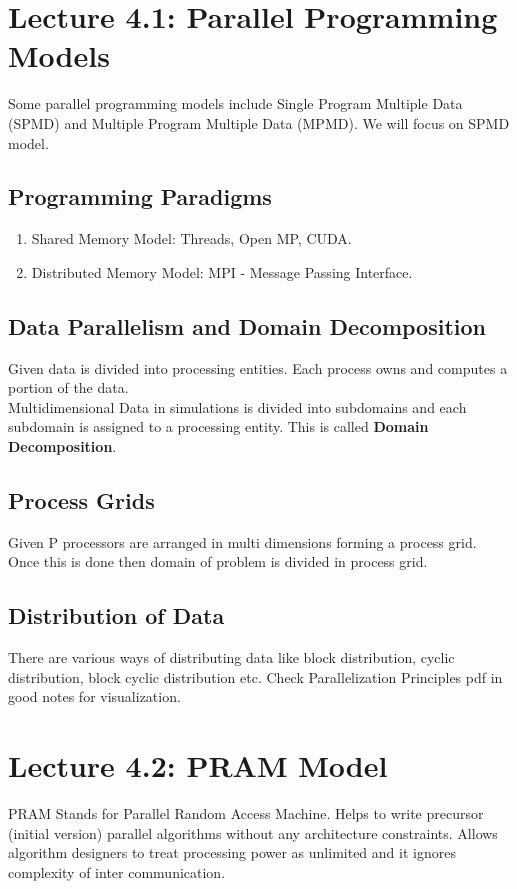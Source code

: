 \section*{Lecture 4.1: Parallel Programming Models}
Some parallel programming models include Single Program Multiple Data (SPMD) and Multiple Program Multiple Data (MPMD). We will focus on SPMD model. \\

\subsection*{Programming Paradigms}
\begin{enumerate}
    \item Shared Memory Model: Threads, Open MP, CUDA.
    \item Distributed Memory Model: MPI - Message Passing Interface.
\end{enumerate}

\subsection*{Data Parallelism and Domain Decomposition}
Given data is divided into processing entities. Each process owns and computes a portion of the data.\\
Multidimensional Data in simulations is divided into subdomains and each subdomain is assigned to a processing entity. This is called \textbf{Domain Decomposition}. 

\subsection*{Process Grids} 
Given P processors are arranged in multi dimensions forming a process grid. Once this is done then domain of problem is divided in process grid.

\subsection*{Distribution of Data}
There are various ways of distributing data like block distribution, cyclic distribution, block cyclic distribution etc. Check Parallelization Principles pdf in good notes for visualization.

\section*{Lecture 4.2: PRAM Model}
PRAM Stands for Parallel Random Access Machine. Helps to write precursor (initial version) parallel algorithms without any architecture constraints. Allows algorithm designers to treat processing power as unlimited and it ignores complexity of inter communication.

